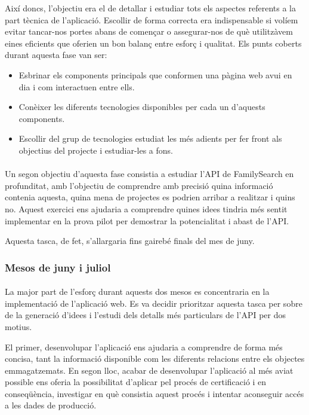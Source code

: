            Així doncs, l'objectiu era el de detallar i estudiar tots els aspectes referents a la part tècnica de l’aplicació. Escollir de forma correcta era indispensable si volíem evitar tancar-nos portes abans de començar o assegurar-nos de què utilitzàvem eines eficients que oferien un bon balanç entre esforç i qualitat. Els punts coberts durant aquesta fase van ser:

            \begin{itemize}
                \item Esbrinar els components principals que conformen una pàgina web avui en dia i com interactuen entre ells.
                \item Conèixer les diferents tecnologies disponibles per cada un d’aquests components.
                \item Escollir del grup de tecnologies estudiat les més adients per fer front als objectius del projecte i estudiar-les a fons.
            \end{itemize}

            \paragraph{}
            Un segon objectiu d’aquesta fase consistia a estudiar l'\gls{API} de FamilySearch en profunditat, amb l'objectiu de comprendre amb precisió quina informació contenia aquesta, quina mena de projectes es podrien arribar a realitzar i quins no. Aquest exercici ens ajudaria a comprendre quines idees tindria més sentit implementar en la prova pilot per demostrar la potencialitat i abast de l'\gls{API}.

            Aquesta tasca, de fet, s'allargaria fins gairebé finals del mes de juny.

        \subsubsection{Mesos de juny i juliol}

            \paragraph{}
            La major part de l’esforç durant aquests dos mesos es concentraria en la implementació de l’aplicació web. Es va decidir prioritzar aquesta tasca per sobre de la generació d'idees i l'estudi dels detalls més particulars de l'API per dos motius.

            El primer, desenvolupar l’aplicació ens ajudaria a comprendre de forma més concisa, tant la informació disponible com les diferents relacions entre els objectes emmagatzemats. En segon lloc, acabar de desenvolupar l'aplicació al més aviat possible ens oferia la possibilitat d’aplicar pel procés de certificació i en conseqüència, investigar en què consistia aquest procés i intentar aconseguir accés a les dades de producció.

